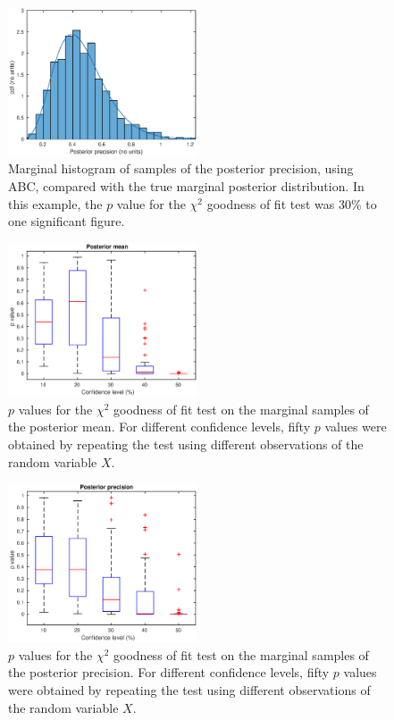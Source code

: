 \documentclass[a4paper]{proc}
\begin{document}
\begin{figure}
\includegraphics[width=0.5\textwidth]{precision.eps}
\caption{Marginal histogram of samples of the posterior precision, using ABC, compared with the true marginal posterior distribution. In this example, the $p$ value for the $\chi^2$ goodness of fit test was $30\%$ to one significant figure.}
\label{precision}
\end{figure}

\begin{figure}
\includegraphics[width=0.5\textwidth]{pvalue_mean.eps}
\caption{$p$ values for the $\chi^2$ goodness of fit test on the marginal samples of the posterior mean. For different confidence levels, fifty $p$ values were obtained by repeating the test using different observations of the random variable $X$.}
\label{pvalue_mean}
\end{figure}

\begin{figure}
\includegraphics[width=0.5\textwidth]{pvalue_precision.eps}
\caption{$p$ values for the $\chi^2$ goodness of fit test on the marginal samples of the posterior precision. For different confidence levels, fifty $p$ values were obtained by repeating the test using different observations of the random variable $X$.}
\label{pvalue_precision}
\end{figure}
\end{document}
